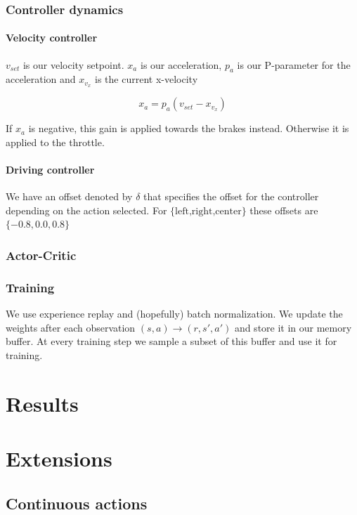 \documentclass{article}
\begin{document}
\subsubsection{Controller dynamics}

\paragraph{Velocity controller}

$v_{set}$ is our velocity setpoint. $x_a$ is our acceleration, $p_a$ is our P-parameter for the acceleration and $x_{v_x}$ is the current x-velocity

\[
	x_a = p_a (v_{set} - x_{v_x})
\]

If $x_a$ is negative, this gain is applied towards the brakes instead. Otherwise it is applied to the throttle.

\paragraph{Driving controller}

We have an offset denoted by $\delta$ that specifies the offset for the controller depending on the action selected. For ${\text{\{left,right,center}\}}$ these offsets are $\{-0.8, 0.0, 0.8\}$

\subsubsection{Actor-Critic}


\subsubsection{Training}

We use experience replay and (hopefully) batch normalization. We update the weights after each observation $(s,a) \rightarrow (r,s',a')$ and store it in our memory buffer. At every training step we sample a subset of this buffer and use it for training.

\section{Results}

\section{Extensions}

\subsection{Continuous actions}
\end{document}
